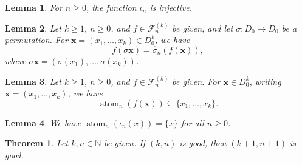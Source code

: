 \documentclass[10pt,a4paper]{amsart}
\newtheorem{lemma}{Lemma}
\newtheorem{theorem}{Theorem}
\newcommand{\N}{\mathbb N}
\DeclareMathOperator{\atom}{atom}
\newcommand{\fset}[2]{\mathcal F^{(#1)}_{#2}}
\begin{document}
\begin{lemma}\label{lem:iota}
    For $n \geq 0$, the function $\iota_n$ is injective.
\end{lemma}

\begin{lemma}\label{lem:permcomm}
    Let $k \geq 1$, $n \geq 0$, and $f \in \fset kn$ be given, and let $\sigma : D_0 \to D_0$ be a permutation. For $\mathbf x = (x_1, \dots, x_k) \in D_0^k$, we have
    \[f(\sigma\mathbf x) = \hat\sigma_n(f(\mathbf x)),\]
    where $\sigma\mathbf x = (\sigma(x_1), \dots, \sigma(x_k))$.
\end{lemma}

\begin{lemma}\label{lem:atom}
    Let $k \geq 1$, $n \geq 0$, and $f \in \fset kn$ be given. For $\mathbf x \in D_0^k$, writing $\mathbf x = (x_1, \dots, x_k)$, we have
    \[\atom_n(f(\mathbf x)) \subseteq \{x_1, \dots, x_k\}.\]
\end{lemma}

\begin{lemma}\label{lem:atomiota}
    We have $\atom_n(\iota_n(x)) = \{x\}$ for all $n \geq 0$.
\end{lemma}

\begin{theorem}\label{thm:diag}
    Let $k, n \in \N$ be given. If $(k, n)$ is good, then $(k+1, n+1)$ is good.
\end{theorem}
\end{document}
